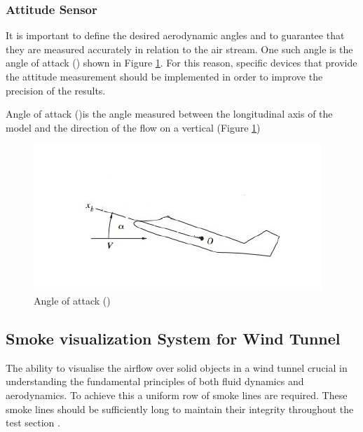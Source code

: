 \subsubsection{Attitude Sensor}
It is important to define the desired aerodynamic angles and to guarantee that they are measured accurately in relation to the air stream. One such angle is the angle of attack (\textalpha) shown in Figure \ref{att}. For this reason, specific devices that provide the attitude measurement should be implemented in order to improve the precision of the results.

Angle of attack (\textalpha)is the angle measured between the longitudinal axis of the model and the direction of the flow on a vertical (Figure \ref{att})
\begin{center}
	\begin{figure}[H]
	\centering
	\includegraphics[width=0.6\linewidth]{Figures/Fig10}
	\caption[Angle of attack]{Angle of attack (\textalpha) \cite{ferreira2015design}}
	\label{att}
	\end{figure}
\end{center}

\subsection{Smoke visualization System for Wind Tunnel}
The ability to visualise the airflow over solid objects in a wind tunnel crucial in understanding the fundamental principles of both fluid dynamics and aerodynamics. To achieve this a uniform row of smoke lines are required. These smoke lines should be sufficiently long to maintain their integrity throughout 
the test section \cite{trinder2013development}.

